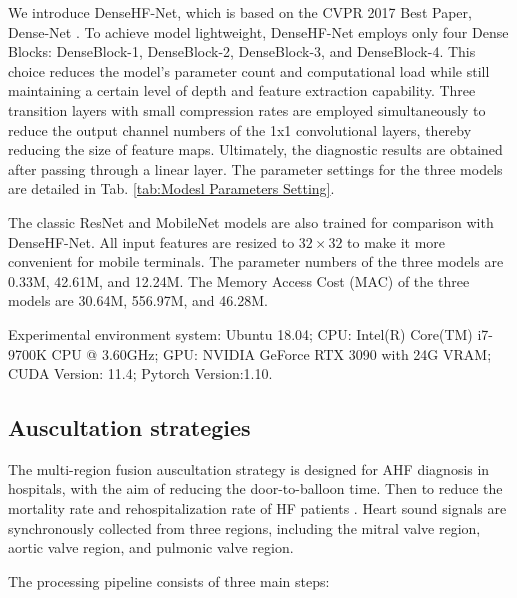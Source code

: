We introduce DenseHF-Net, which is based on the CVPR 2017 Best Paper, Dense-Net \cite{huang2017densely}. 
To achieve model lightweight, DenseHF-Net employs only four Dense Blocks: DenseBlock-1, DenseBlock-2, DenseBlock-3, and DenseBlock-4. This choice reduces the model's parameter count and computational load while still maintaining a certain level of depth and feature extraction capability. Three transition layers with small compression rates are employed simultaneously to reduce the output channel numbers of the 1x1 convolutional layers, thereby reducing the size of feature maps. Ultimately, the diagnostic results are obtained after passing through a linear layer. The parameter settings for the three models are detailed in Tab. \ref{tab:Modesl Parameters Setting}.

The classic ResNet \cite{he2016deep} and MobileNet \cite{howard2017mobilenets} models are also trained for comparison with DenseHF-Net. All input features are resized to $32\times32$ to make it more convenient for mobile terminals. The parameter numbers of the three models are 0.33M, 42.61M, and 12.24M. The Memory Access Cost (MAC) of the three models are 30.64M, 556.97M, and 46.28M.

Experimental environment system: Ubuntu 18.04; CPU: Intel(R) Core(TM) i7-9700K CPU @ 3.60GHz; GPU: NVIDIA GeForce RTX 3090 with 24G VRAM; CUDA Version: 11.4; Pytorch Version:1.10.
\subsection{Auscultation strategies}
The multi-region fusion auscultation strategy is designed for AHF diagnosis in hospitals, with the aim of reducing the door-to-balloon time. Then to reduce the mortality rate and rehospitalization rate of HF patients \cite{fan2021effects}. Heart sound signals are synchronously collected from three regions, including the mitral valve region, aortic valve region, and pulmonic valve region.

The processing pipeline consists of three main steps: 

